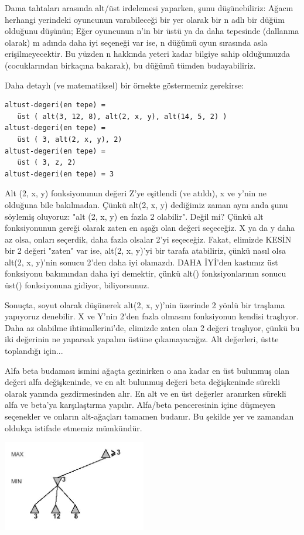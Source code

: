 \documentclass[12pt,fleqn]{article}\usepackage{../../common}
\begin{document}
Dama tahtaları arasında alt/üst irdelemesi yaparken, şunu düşünebiliriz:
Ağacın herhangi yerindeki oyuncunun varabileceği bir yer olarak bir n adlı
bir düğüm olduğunu düşünün; Eğer oyuncunun n'in bir üstü ya da daha
tepesinde (dallanma olarak) m adında daha iyi seçeneği var ise, n düğümü
oyun sırasında asla erişilmeyecektir. Bu yüzden n hakkında yeteri kadar
bilgiye sahip olduğumuzda (cocuklarından birkaçına bakarak), bu düğümü
tümden budayabiliriz.

Daha detaylı (ve matematiksel) bir örnekte göstermemiz gerekirse:

\begin{verbatim}
altust-degeri(en tepe) = 
   üst ( alt(3, 12, 8), alt(2, x, y), alt(14, 5, 2) )
altust-degeri(en tepe) = 
   üst ( 3, alt(2, x, y), 2)
altust-degeri(en tepe) = 
   üst ( 3, z, 2)
altust-degeri(en tepe) = 3
\end{verbatim}

Alt (2, x, y) fonksiyonunun değeri Z'ye eşitlendi (ve atıldı), x ve y'nin ne
olduğuna bile bakılmadan. Çünkü alt(2, x, y) dediğimiz zaman aynı anda şunu
söylemiş oluyoruz: "alt (2, x, y) en fazla 2 olabilir". Değil mi? Çünkü alt
fonksiyonunun gereği olarak zaten en aşağı olan değeri seçeceğiz. X ya da y
daha az olsa, onları seçerdik, daha fazla olsalar 2'yi seçeceğiz. Fakat,
elimizde KESİN bir 2 değeri "zaten" var ise, alt(2, x, y)'yi bir tarafa
atabiliriz, çünkü nasıl olsa alt(2, x, y)'nin sonucu 2'den daha iyi
olamazdı. DAHA İYİ'den kastımız üst fonksiyonu bakımından daha iyi demektir,
çünkü alt() fonksiyonlarının sonucu üst() fonksiyonuna gidiyor, biliyorsunuz.

Sonuçta, soyut olarak düşünerek alt(2, x, y)'nin üzerinde 2 yönlü bir
traşlama yapıyoruz denebilir. X ve Y'nin 2'den fazla olmasını fonksiyonun
kendisi traşlıyor. Daha az olabilme ihtimallerini'de, elimizde zaten olan 2
değeri traşlıyor, çünkü bu iki değerinin ne yaparsak yapalım üstüne
çıkamayacağız. Alt değerleri, üstte toplandığı için...

Alfa beta budaması ismini ağaçta gezinirken o ana kadar en üst bulunmuş
olan değeri alfa değişkeninde, ve en alt bulunmuş değeri beta değişkeninde
sürekli olarak yanında gezdirmesinden alır. En alt ve en üst değerler
aranırken sürekli alfa ve beta'ya karşılaştırma yapılır. Alfa/beta
penceresinin içine düşmeyen seçenekler ve onların alt-ağaçları tamamen
budanır. Bu şekilde yer ve zamandan oldukça istifade etmemiz mümkündür.

\includegraphics[height=4cm]{altust_budama_1.jpg}
\end{document}
